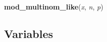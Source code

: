     \label{pymc:distributions:mod_multinom_like}

    \vspace{0.5ex}

    \begin{boxedminipage}{\textwidth}

    \raggedright \textbf{mod\_multinom\_like}(\textit{x}, \textit{n}, \textit{p})

    \end{boxedminipage}



  \subsection{Variables}

